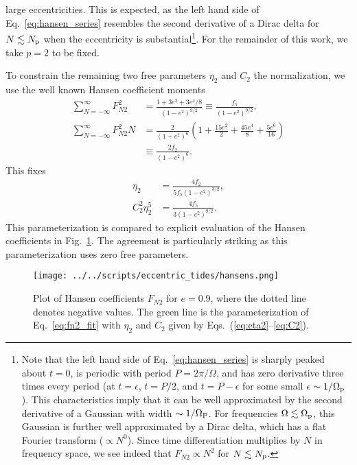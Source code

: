 \documentclass[
        fleqn,
        usenatbib,
    ]{mnras}
\newcommand*{\p}[1]{\left(#1\right)}
\begin{document}
large eccentricities. This is expected, as the left hand side of
Eq.~\eqref{eq:hansen_series} resembles the second derivative of a Dirac delta
for $N \lesssim N_{\rm p}$ when the eccentricity is substantial\footnote{
Note that the left hand side of Eq.~\eqref{eq:hansen_series} is
sharply peaked about $t = 0$, is periodic with period $P = 2\pi / \Omega$, and
has zero derivative three times every period (at $t = \epsilon$, $t = P / 2$,
and $t = P - \epsilon$ for some small $\epsilon \sim 1 / \Omega_{\rm p}$). This
characteristics imply that it can be well approximated by the second derivative
of a Gaussian with width $\sim 1 / \Omega_{\rm P}$. For frequencies $\Omega
\lesssim \Omega_{\rm p}$, this Gaussian is further well approximated by a Dirac
delta, which has a flat Fourier transform ($\propto N^0$). Since time
differentiation multiplies by $N$ in frequency space, we see indeed that $F_{N2}
\propto N^2$ for $N \lesssim N_{\rm p}$.}. For the remainder of this work, we
take $p = 2$ to be fixed.

To constrain the remaining two free parameters $\eta_2$ and $C_2$ the
normalization, we use the well known Hansen coefficient moments
\citep{hut81}
\begin{align}
    \sum\limits_{N = -\infty}^\infty F_{N2}^2
        &= \frac{1 + 3e^2 + 3e^4/8}{\p{1 - e^2}^{9/2}}
            \equiv \frac{f_5}{\p{1 - e^2}^{9/2}},\\
    \sum\limits_{N = -\infty}^\infty F_{N2}^2N
        &= \frac{2}{\p{1 - e^2}^6}\p{1 + \frac{15e^2}{2}
            + \frac{45 e^4}{8} + \frac{5e^6}{16}}\nonumber\\
        &\equiv \frac{2f_2}{\p{1 - e^2}^6}.
\end{align}
This fixes
\begin{align}
    \eta_2 &= \frac{4f_2}{5f_5\p{1 - e^2}^{3/2}},\label{eq:eta2}\\
    C_2^2\eta_2^5 &= \frac{4f_5}{3\p{1 - e^2}^{9/2}}.\label{eq:C2}
\end{align}
This parameterization is compared to explicit evaluation of the Hansen
coefficients in Fig.~\ref{fig:hansens}. The agreement is particularly striking
as this parameterization uses zero free parameters.
\begin{figure}
    \centering
    \texttt{[image: ../../scripts/eccentric\_tides/hansens.png]}
    \caption{Plot of Hansen coefficients $F_{N2}$ for $e = 0.9$, where the
    dotted line denotes negative values. The green line is the parameterization
    of Eq.~\eqref{eq:fn2_fit} with $\eta_2$ and $C_2$ given by
    Eqs.~(\ref{eq:eta2}--\ref{eq:C2}). }\label{fig:hansens}
\end{figure}
\end{document}
